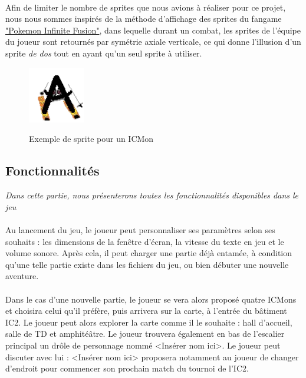 \documentclass[12pt,a4paper, twoside]{article}
\begin{document}
        \paragraph{} Afin de limiter le nombre de sprites que nous avions à réaliser pour ce projet, nous nous sommes inspirés de la méthode d'affichage des sprites du fangame \href{https://infinitefusion.fandom.com/wiki/Pok%C3%A9mon_Infinite_Fusion_Wiki}{"Pokemon Infinite Fusion"}, dans lequelle durant un combat, les sprites de l'équipe du joueur sont retournés par symétrie axiale verticale, ce qui donne l'illusion d'un sprite \emph{de dos} tout en ayant qu'un seul sprite à utiliser.
        \begin{figure}[h!]
            \centering
            \includegraphics[width=0.22\textwidth]{../assets/Monsters/New Versions/A-ski.png}
            \label{fig:ICMon}
            \caption{Exemple de sprite pour un ICMon}
        \end{figure} 

    \subsection{Fonctionnalités}
        \emph{Dans cette partie, nous présenterons toutes les fonctionnalités disponibles dans le jeu} \\
        \paragraph{} Au lancement du jeu, le joueur peut personnaliser ses paramètres selon ses souhaits : les dimensions de la fenêtre d'écran, la vitesse du texte en jeu et le volume sonore. Après cela, il peut charger une partie déjà entamée, à condition qu'une telle partie existe dans les fichiers du jeu, ou bien débuter une nouvelle aventure. \paragraph{}
        Dans le cas d'une nouvelle partie, le joueur se vera alors proposé quatre ICMons et choisira celui qu'il préfère, puis arrivera sur la carte, à l'entrée du bâtiment IC2. Le joueur peut alors explorer la carte comme il le souhaite : hall d'accueil, salle de TD et amphitéâtre. Le joueur trouvera également en bas de l'escalier principal un drôle de personnage nommé <Insérer nom ici>.
        Le joueur peut discuter avec lui : <Insérer nom ici> proposera notamment au joueur de changer d'endroit pour commencer son prochain match du tournoi de l'IC2.
\end{document}
